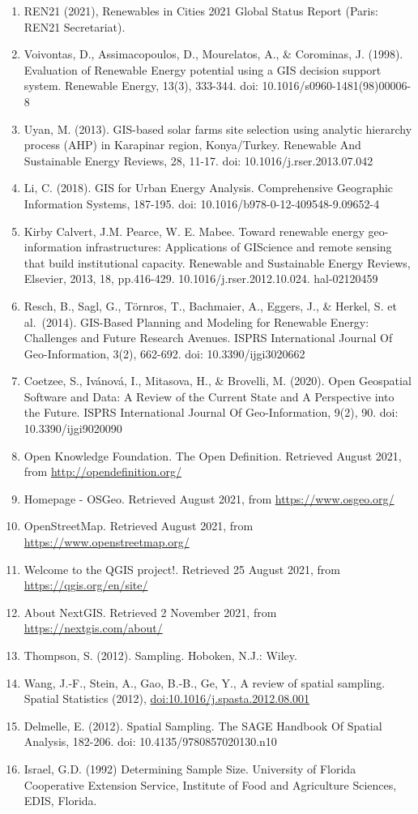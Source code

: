 \documentclass[
]{book}
\providecommand{\tightlist}{%
  \setlength{\itemsep}{0pt}\setlength{\parskip}{0pt}}
\begin{document}
\begin{enumerate}
\def\labelenumi{\arabic{enumi}.}
\tightlist
\item
  REN21 (2021), Renewables in Cities 2021 Global Status Report (Paris: REN21 Secretariat).
\item
  Voivontas, D., Assimacopoulos, D., Mourelatos, A., \& Corominas, J. (1998). Evaluation of Renewable Energy potential using a GIS decision support system. Renewable Energy, 13(3), 333-344. doi: 10.1016/s0960-1481(98)00006-8
\item
  Uyan, M. (2013).
  GIS-based solar farms site selection using analytic hierarchy process (AHP) in Karapinar region, Konya/Turkey. Renewable And Sustainable Energy Reviews, 28, 11-17. doi: 10.1016/j.rser.2013.07.042
\item
  Li, C. (2018). GIS for Urban Energy Analysis. Comprehensive Geographic Information Systems, 187-195. doi: 10.1016/b978-0-12-409548-9.09652-4
\item
  Kirby Calvert, J.M. Pearce, W. E. Mabee. Toward renewable energy geo-information infrastructures: Applications of GIScience and remote sensing that build institutional capacity. Renewable and Sustainable Energy Reviews, Elsevier, 2013, 18, pp.416-429. 10.1016/j.rser.2012.10.024. hal-02120459
\item
  Resch, B., Sagl, G., Törnros, T., Bachmaier, A., Eggers, J., \& Herkel, S. et al.~(2014). GIS-Based Planning and Modeling for Renewable Energy: Challenges and Future Research Avenues. ISPRS International Journal Of Geo-Information, 3(2), 662-692. doi: 10.3390/ijgi3020662
\item
  Coetzee, S., Ivánová, I., Mitasova, H., \& Brovelli, M. (2020). Open Geospatial Software and Data: A Review of the Current State and A Perspective into the Future. ISPRS International Journal Of Geo-Information, 9(2), 90. doi: 10.3390/ijgi9020090
\item
  Open Knowledge Foundation. The Open Definition. Retrieved August 2021, from \url{http://opendefinition.org/}
\item
  Homepage - OSGeo. Retrieved August 2021, from \url{https://www.osgeo.org/}
\item
  OpenStreetMap. Retrieved August 2021, from \url{https://www.openstreetmap.org/}
\item
  Welcome to the QGIS project!. Retrieved 25 August 2021, from \url{https://qgis.org/en/site/}
\item
  About NextGIS. Retrieved 2 November 2021, from \url{https://nextgis.com/about/}
\item
  Thompson, S. (2012). Sampling. Hoboken, N.J.: Wiley.
\item
  Wang, J.-F., Stein, A., Gao, B.-B., Ge, Y., A review of spatial
  sampling. Spatial Statistics (2012), \url{doi:10.1016/j.spasta.2012.08.001}
\item
  Delmelle, E. (2012). Spatial Sampling. The SAGE Handbook Of Spatial Analysis, 182-206. doi: 10.4135/9780857020130.n10
\item
  Israel, G.D. (1992) Determining Sample Size. University of Florida Cooperative Extension Service, Institute of Food and Agriculture Sciences, EDIS, Florida.
\end{enumerate}

  
\end{document}
